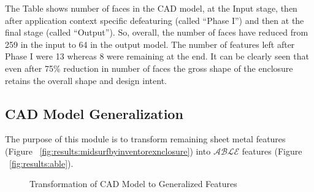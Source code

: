 
The Table shows number of faces in the CAD model, at the Input stage, then after application context specific defeaturing (called ``Phase I'') and then at the final stage (called ``Output''). So, overall, the number of faces have reduced from 259 in the input to 64 in the output model. The number of features left after Phase I were 13 whereas 8 were remaining at the end. It can be clearly seen that even after 75\% reduction in number of faces the gross shape of the enclosure retains the overall shape and design intent.

\subsection{CAD Model Generalization}

The purpose of this module is to transform remaining sheet metal features (Figure ~\ref{fig:results:midsurfbyinventorexnclosure}) into $\mathcal{ABLE}$ features (Figure ~\ref{fig:results:able}).


\begin{figure}[!h]
\centering     %
{}\quad
{}
\caption{Transformation of CAD Model to Generalized Features}\label{fig:results:enlosurepreable}
\end{figure}

